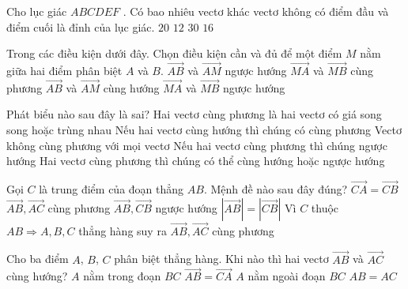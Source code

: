 \begin{ex}%
	Cho lục giác $ABCDEF$ . Có bao nhiêu vectơ khác vectơ không có điểm đầu và điểm cuối là đỉnh của lục giác.
	\choice
	{$20$}
	{$12$}
	{\True $30$}
	{$16$}
\end{ex}


\begin{ex}%
	Trong các điều kiện dưới đây. Chọn điều kiện cần và đủ để một điểm $M$ nằm giữa hai điểm phân biệt $A$ và $B$.
	\choice
	{ $\overrightarrow{AB}$ và $\overrightarrow{AM}$ ngược hướng}
	{ $\overrightarrow{MA}$ và $\overrightarrow{MB}$ cùng phương}
	{ $\overrightarrow{AB}$ và $\overrightarrow{AM}$ cùng hướng}
	{\True $\overrightarrow{MA}$ và $\overrightarrow{MB}$ ngược hướng}
\end{ex}

\begin{ex}%
	Phát biểu nào sau đây là sai?
	\choice
	{Hai vectơ cùng phương là hai vectơ có giá song song hoặc trùng nhau}
	{Nếu hai vectơ cùng hướng thì chúng có cùng phương}
	{Vectơ không cùng phương với mọi vectơ}
	{\True Nếu hai vectơ cùng phương thì chúng ngược hướng}
	\loigiai
	{Hai vectơ cùng phương thì chúng có thể cùng hướng hoặc ngược hướng}
\end{ex}

\begin{ex}%
	Gọi $C$ là trung điểm của đoạn thẳng $AB$. Mệnh đề nào sau đây đúng?
	\choice
	{$\overrightarrow{CA}=\overrightarrow{CB}$}
	{\True $\overrightarrow{AB},\overrightarrow{AC}$ cùng phương}
	{$\overrightarrow{AB},\overrightarrow{CB}$ ngược hướng}
	{$|\overrightarrow{AB}|=|\overrightarrow{CB}|$}
	\loigiai
	{Vì $C$ thuộc $AB\Rightarrow A,B,C$ thẳng hàng suy ra $\overrightarrow{AB},\overrightarrow{AC}$ cùng phương}
\end{ex}


\begin{ex}%
	Cho ba điểm $A$, $B$, $C$ phân biệt thẳng hàng. Khi nào thì hai vectơ $\overrightarrow{AB}$ và $\overrightarrow{AC}$ cùng hướng?
	\choice
	{ $A$ nằm trong đoạn $BC$}
	{ $\overrightarrow{AB}=\overrightarrow{CA}$}
	{\True $A$ nằm ngoài đoạn $BC$}
	{ $AB=AC$}
\end{ex}

